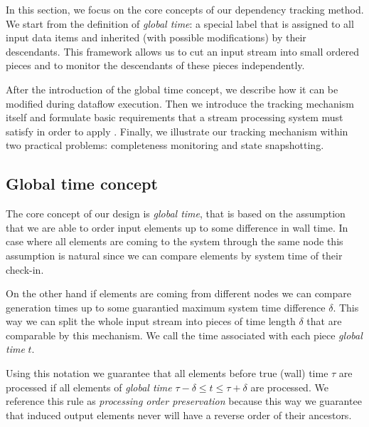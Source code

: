\label{fs-acker-design}

In this section, we focus on the core concepts of our dependency tracking method. We start from the definition of \textit{global time}: a special label that is assigned to all input data items and inherited (with possible modifications) by their descendants. This framework allows us to cut an input stream into small ordered pieces and to monitor the descendants of these pieces independently.

After the introduction of the global time concept, we describe how it can be modified during dataflow execution. Then we introduce the tracking mechanism itself and formulate basic requirements that a stream processing system must satisfy in order to apply \tracker . Finally, we illustrate our tracking mechanism within two practical problems: completeness monitoring and state snapshotting.


\subsection{Global time concept}
\label{fs-acker-gt}
The core concept of our design is \textit{global time}, that is based on the assumption that we are able to order input elements up to some difference in wall time. In case where all elements are coming to the system through the same node this assumption is natural since we can compare elements by system time of their check-in.

On the other hand if elements are coming from different nodes we can compare generation times up to some guarantied maximum system time difference $\delta$. This way we can split the whole input stream into pieces of time length $\delta$ that are comparable by this mechanism. We call the time associated with each piece \textit{global time} $t$.

Using this notation we guarantee that all elements before true (wall) time $\tau$ are processed if all elements of \textit{global time} $\tau - \delta \le t \le \tau + \delta$ are processed. We reference this rule as \textit{processing order preservation} because this way we guarantee that induced output elements never will have a reverse order of their ancestors.

